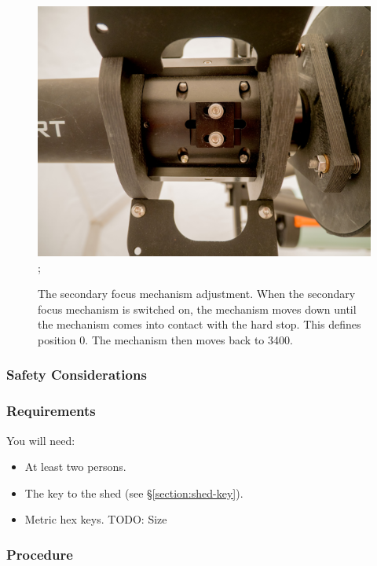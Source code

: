 \begin{figure}
\begin{center}
\begin{labeled}{\includegraphics[width=0.8\linewidth]{figures/secondary-coatli-adjustment.jpg}}
;
\end{labeled}
\caption{The secondary focus mechanism adjustment. When the secondary focus mechanism is switched on, the mechanism moves down until the mechanism comes into contact with the hard stop. This defines position 0. The mechanism then moves back to 3400.}
\label{figure:secondary-adjustment}
\end{center}
\end{figure}

\subsubsection{Safety Considerations}


\subsubsection{Requirements}

You will need:
\begin{itemize}
\item At least two persons.
\item The key to the shed (see \S\ref{section:shed-key}).
\item Metric hex keys. TODO: Size
\end{itemize}

\subsubsection{Procedure}


